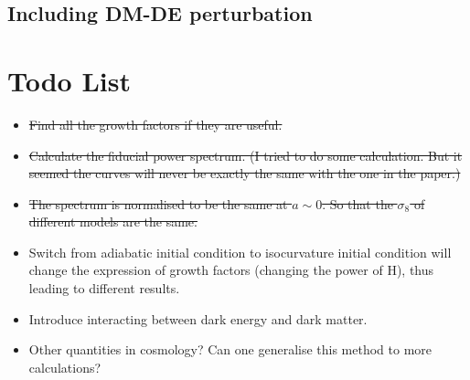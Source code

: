 \documentclass{article}
\begin{document}
\subsection{Including DM-DE perturbation}






























\section{Todo List}
\begin{itemize}
\item
\sout{Find all the growth factors if they are useful.}
\item
\sout{Calculate the fiducial power spectrum.
({\color{red}I tried to do some calculation. But it seemed the curves will never be exactly the same with the one in the paper.})}

\item
\sout{The spectrum is normalised to be the same at $a\sim 0$. So that the $\sigma_8$ of different models are the same.}

\item
Switch from adiabatic initial condition to isocurvature initial condition will change the expression of growth factors (changing the power of H), thus leading to different results.

\item
Introduce interacting between dark energy and dark matter.

\item
Other quantities in cosmology? Can one generalise this method to more calculations?

\end{itemize}
\end{document}
